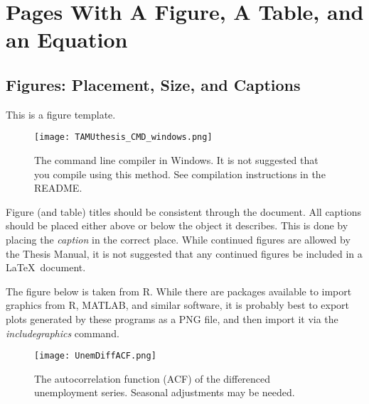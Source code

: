 %
%
%



\chapter{Pages With A Figure, A Table, and an Equation}
\section{Figures: Placement, Size, and Captions}
This is a figure template.
\begin{figure}[ht]
\centering
\texttt{[image: TAMUthesis\_CMD\_windows.png]}
\caption[The command line compiler in Windows.]{The command line compiler in Windows. It is not suggested that you compile using this method. See compilation instructions in the README.}

\label{fig:CMD_1}

\end{figure}

Figure (and table) titles should be consistent through the document. All captions should be placed either above or below the object it describes. This is done by placing the \textit{caption} in the correct place. While continued figures are allowed by the Thesis Manual, it is not suggested that any continued figures be included in a \LaTeX\ document.

The figure below is taken from R. While there are packages available to import graphics from R, MATLAB, and similar software, it is probably best to export plots generated by these programs as a PNG file, and then import it via the \textit{includegraphics} command.

\begin{figure}[ht]
	\centering
	\texttt{[image: UnemDiffACF.png]}
	\caption{The autocorrelation function (ACF) of the differenced unemployment series. Seasonal adjustments may be needed.}
\end{figure}

